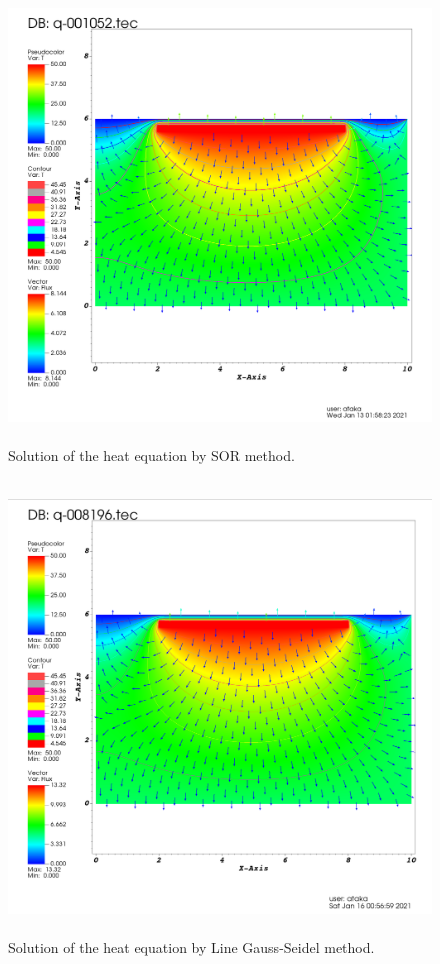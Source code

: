 \documentclass[letterpaper,12pt]{article}
\begin{document}
\begin{figure}[H] 
	\centering 
	\includegraphics[max height=12cm]{graphs/SOR_O19_rad_default/SOR_O19_rad_default.png}
	\caption{Solution of the heat equation by SOR method.}
 	\label{fig:sorrad}
\end{figure}
\begin{figure}[H] 
	\centering 
	\includegraphics[max height=12cm]{graphs/linegauss_rad_default/linegauss_rad_default.png}
	\caption{Solution of the heat equation by Line Gauss-Seidel method.}
 	\label{fig:linegaussrad}
\end{figure}
\end{document}
